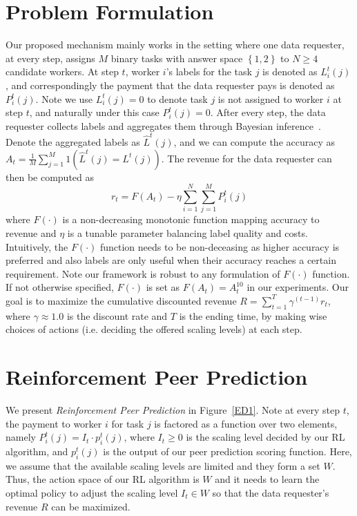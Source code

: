\documentclass[letterpaper]{article} %
\begin{document}
\section{Problem Formulation}
Our proposed mechanism mainly works in the setting where one data requester, at every step, assigns $M$ binary tasks with answer space $\left\{1,2\right\}$ to $N \geq 4$ candidate workers. At step $t$, worker $i$'s labels for the task $j$ is denoted as $L_i^t(j)$, and correspondingly the payment that the data requester pays is denoted as $P^{t}_i(j)$. Note we use $L^{t}_i(j)=0$ to denote task $j$ is not assigned to worker $i$ at step $t$, and naturally under this case $P^{t}_i(j)=0$.
After every step, the data requester collects labels and aggregates them through Bayesian inference~\cite{zheng2017truth}.
Denote the aggregated labels as $\hat{L}^{t}(j)$, and we can compute the accuracy as $A_t = \frac{1}{M}{\sum}_{j=1}^{M} 1(\hat{L}^{t}(j) = L^{t}(j))$.
The revenue for the data requester can then be computed as
\begin{equation}
r_t = F(A_t) - \eta {\sum}_{i=1}^{N}{\sum}_{j=1}^{M}P^t_i(j)
\end{equation}
where $F(\cdot)$ is a non-decreasing monotonic function mapping accuracy to revenue and $\eta$ is a
tunable parameter balancing label quality and costs. Intuitively, the $F(\cdot)$ function needs to be non-deceasing as higher accuracy is preferred and also labels are only useful when their accuracy reaches a certain requirement. Note our framework is robust to any formulation of $F(\cdot)$ function. If not otherwise specified, $F(\cdot)$ is set as $F(A_t)=A^{10}_t$ in our experiments.
Our goal is to maximize the cumulative discounted revenue $R = \sum_{t=1}^{T} \gamma^{(t-1)} r_t$, where $\gamma\approx 1.0$ is the discount rate and $T$ is the ending time, by making wise choices of actions  (i.e. deciding the offered scaling levels) at each step.

\section{Reinforcement Peer Prediction}
We present \emph{Reinforcement Peer Prediction} in Figure~\ref{ED1}. Note at every step $t$, the payment to worker $i$ for task $j$ is factored as a function over two elements, namely $P^{t}_i(j)=I_t \cdot p^{t}_i(j)$, where $I_t\geq 0$ is the scaling level decided by our RL algorithm, and
$p^t_i(j)$ is the output of our peer prediction scoring function.
Here, we assume that the available scaling levels are limited and they form a set $W$.
Thus, the action space of our RL algorithm is $W$ and it needs to learn the optimal policy to adjust the scaling level $I_t\in W$ so that the data requester's revenue $R$ can be maximized.
\end{document}
